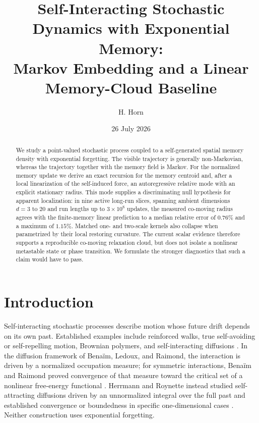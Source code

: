 \documentclass[reprint,amsmath,amssymb,aps,prd,nofootinbib,floatfix]{revtex4-2}
\begin{document}
\title{Self-Interacting Stochastic Dynamics with Exponential Memory:\\
Markov Embedding and a Linear Memory-Cloud Baseline}

\author{H. Horn}

\date{26 July 2026}

\begin{abstract}
We study a point-valued stochastic process coupled to a self-generated spatial
memory density with exponential forgetting.
The visible trajectory is generally non-Markovian, whereas the trajectory
together with the memory field is Markov.
For the normalized memory update we derive an exact recursion for the memory
centroid and, after a local linearization of the self-induced force, an
autoregressive relative mode with an explicit stationary radius.
This mode supplies a discriminating null hypothesis for apparent localization:
in nine active long-run slices, spanning ambient dimensions $d=3$ to $20$ and
run lengths up to $3\times10^8$ updates, the measured co-moving radius agrees
with the finite-memory linear prediction to a median relative error of
$0.76\%$ and a maximum of $1.15\%$.
Matched one- and two-scale kernels also collapse when parametrized by their
local restoring curvature.
The current scalar evidence therefore supports a reproducible co-moving
relaxation cloud, but does not isolate a nonlinear metastable state or phase
transition.
We formulate the stronger diagnostics that such a claim would have to pass.
\end{abstract}

\maketitle

\section{Introduction}

Self-interacting stochastic processes describe motion whose future drift
depends on its own past.
Established examples include reinforced walks, true self-avoiding or
self-repelling motion, Brownian polymers, and self-interacting diffusions
\cite{Pemantle2007,AmitParisiPeliti1983,TothWerner1998,
DurrettRogers1992,PelitiPietronero1987}.
In the diffusion framework of Bena\"im, Ledoux, and Raimond, the interaction is
driven by a normalized occupation measure; for symmetric interactions,
Bena\"im and Raimond proved convergence of that measure toward the critical
set of a nonlinear free-energy functional
\cite{BenAImRaimond2002,BenaimRaimond2005}.
Herrmann and Roynette instead studied self-attracting diffusions driven by an
unnormalized integral over the full past and established convergence or
boundedness in specific one-dimensional cases \cite{HerrmannRoynette2003}.
Neither construction uses exponential forgetting.
\end{document}
